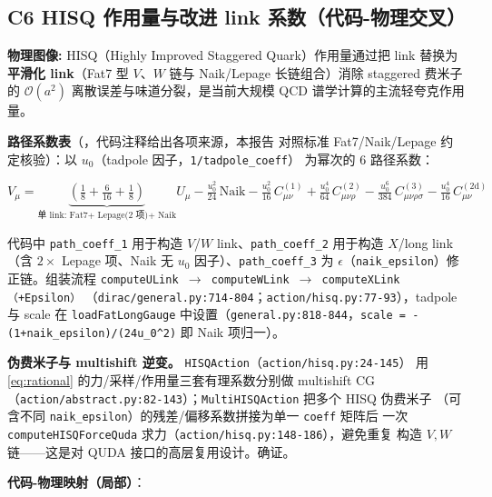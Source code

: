 \documentclass[UTF8]{ctexart}
\begin{document}
\subsection{C6 HISQ 作用量与改进 link 系数（代码-物理交叉）}

\begin{physbox}
\textbf{物理图像:} HISQ（Highly Improved Staggered Quark）作用量通过把 link 替换为
\textbf{平滑化 link}（Fat7 型 $V$、$W$ 链与 Naik/Lepage 长链组合）消除 staggered 费米子
的 $\mathcal{O}(a^2)$ 离散误差与味道分裂，是当前大规模 QCD 谱学计算的主流轻夸克作用量。
\end{physbox}

\textbf{路径系数表}（\texttt{}，代码注释给出各项来源，本报告
对照标准 Fat7/Naik/Lepage 约定核验）：以 $u_0$（tadpole 因子，\texttt{\nolinkurl{1/tadpole_coeff}}）
为幂次的 6 路径系数：

\begin{equation}\label{eq:hisq}
V_\mu = \underbrace{\left(\tfrac18 + \tfrac{6}{16} + \tfrac18\right)}_{\text{单 link: Fat7+ Lepage(2 项)+ Naik}} U_\mu
- \tfrac{u_0^2}{24}\,\mathrm{Naik} - \tfrac{u_0^2}{16}\,C_{\mu\nu}^{(1)}
+ \tfrac{u_0^4}{64}\,C_{\mu\nu\rho}^{(2)} - \tfrac{u_0^6}{384}\,C_{\mu\nu\rho\sigma}^{(3)}
- \tfrac{u_0^4}{16}\,C_{\mu\nu}^{(2\mathrm{d})}
\end{equation}

代码中 \texttt{path\_coeff\_1} 用于构造 $V$/$W$ link、\texttt{path\_coeff\_2} 用于构造
$X$/long link（含 $2\times$ Lepage 项、Naik 无 $u_0$ 因子）、\texttt{path\_coeff\_3} 为
$\epsilon$（\texttt{naik\_epsilon}）修正链。组装流程
\texttt{computeULink $\to$ computeWLink $\to$ computeXLink（+Epsilon）}
（\texttt{dirac/general.py:714-804}；\texttt{action/hisq.py:77-93}），tadpole 与 scale
在 \texttt{loadFatLongGauge} 中设置（\texttt{general.py:818-844}，\texttt{scale =
-(1+naik\_epsilon)/(24u_0^2)} 即 Naik 项归一）。

\textbf{伪费米子与 multishift 逆变。} \texttt{HISQAction}（\texttt{action/hisq.py:24-145}）
用 \eqref{eq:rational} 的力/采样/作用量三套有理系数分别做 multishift CG
（\texttt{action/abstract.py:82-143}）；\texttt{MultiHISQAction} 把多个 HISQ 伪费米子
（可含不同 \texttt{naik\_epsilon}）的残差/偏移系数拼接为单一 \texttt{coeff} 矩阵后
一次 \texttt{computeHISQForceQuda} 求力（\texttt{action/hisq.py:148-186}），避免重复
构造 $V,W$ 链——这是对 QUDA 接口的高层复用设计。\textcolor{accent}{确证}。

\textbf{代码-物理映射（局部）}：
\end{document}
